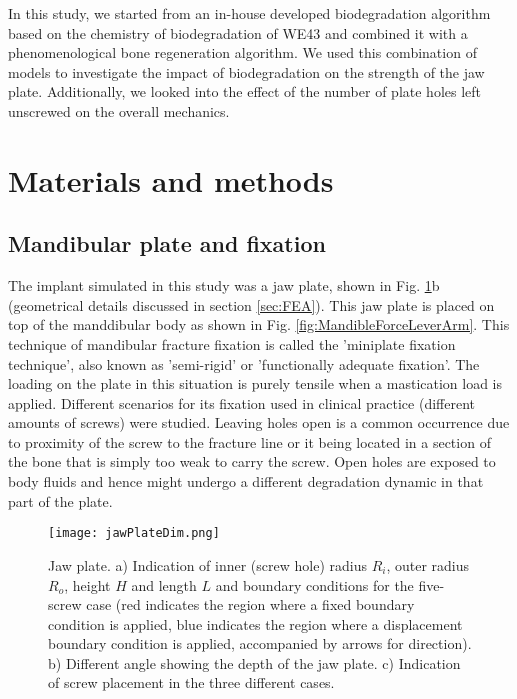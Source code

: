 In this study, we started from an in-house developed biodegradation algorithm based on the chemistry of biodegradation of WE43 and combined it with a phenomenological bone regeneration algorithm. We used this combination of models to investigate the impact of biodegradation on the strength of the jaw plate. Additionally, we looked into the effect of the number of plate holes left unscrewed on the overall mechanics.


\section{Materials and methods}

\subsection{Mandibular plate and fixation}

The implant simulated in this study was a jaw plate, shown in Fig. \ref{fig:jawPlateDim}b (geometrical details discussed in section \ref{sec:FEA}). This jaw plate is placed on top of the manddibular body as shown in Fig. \ref{fig:MandibleForceLeverArm}. This technique of mandibular fracture fixation is called the 'miniplate fixation technique', also known as 'semi-rigid' or 'functionally adequate fixation'. The loading on the plate in this situation is purely tensile when a mastication load is applied. Different scenarios for its fixation used in clinical practice (different amounts of screws) were studied. Leaving holes open is a common occurrence due to proximity of the screw to the fracture line or it being located in a section of the bone that is simply too weak to carry the screw. Open holes are exposed to body fluids and hence might undergo a different degradation dynamic in that part of the plate.

\begin{figure}[h]
    \centering
    \texttt{[image: jawPlateDim.png]}
    \caption[Indication of dimensions and screws placement on the jaw plate]{Jaw plate. a) Indication of inner (screw hole) radius $R_i$, outer radius $R_o$, height $H$ and length $L$ and boundary conditions for the five-screw case (red indicates the region where a fixed boundary condition is applied, blue indicates the region where a displacement boundary condition is applied, accompanied by arrows for direction). b) Different angle showing the depth of the jaw plate. c) Indication of screw placement in the three different cases.}
    \label{fig:jawPlateDim}
\end{figure}

